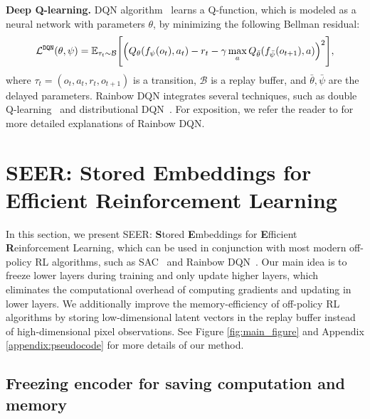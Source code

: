 \documentclass{article}
\begin{document}
{\bf Deep Q-learning.} DQN algorithm~\citep{mnih2015human} learns a Q-function, which is modeled as a neural network with parameters $\theta$,
by minimizing the following Bellman residual:
\begin{align*}
  \mathcal{L}^{\tt DQN} (\theta, \psi) = \mathbb{E}_{\tau_t \sim \mathcal{B}} \Bigg[\Big(Q_\theta(f_\psi(o_t),a_t) - r_t 
  - \gamma \max_a Q_{\bar \theta} (f_{\bar \psi}(o_{t+1}),a) \Big)^2\Bigg], \label{eq:dqn}
\end{align*}
where $\tau_t = (o_t,a_t,r_t,o_{t+1})$ is a transition,
$\mathcal{B}$ is a replay buffer, 
and $\bar \theta, \bar \psi$ are the delayed parameters.
Rainbow DQN integrates several techniques,
such as double Q-learning~\citep{van2016deep} and distributional DQN~\citep{bellemare2017distributional}.
For exposition, we refer the reader to \citet{hessel2018rainbow} for more detailed explanations of Rainbow DQN.

\section{SEER: Stored Embeddings for Efficient Reinforcement Learning}

In this section, we present SEER: {\bf S}tored {\bf E}mbeddings for {\bf E}fficient {\bf R}einforcement Learning, which can be used in conjunction with most modern off-policy RL algorithms, such as SAC~\citep{haarnoja2018soft} and Rainbow DQN~\citep{hessel2018rainbow}.
Our main idea is to freeze lower layers during training and only update higher layers, which eliminates the computational overhead of computing gradients and updating in lower layers.
We additionally improve the memory-efficiency of off-policy RL algorithms by storing low-dimensional latent vectors in the replay buffer instead of high-dimensional pixel observations. See Figure \ref{fig:main_figure} and 
Appendix \ref{appendix:pseudocode} for more details of our method.

\subsection{Freezing encoder for saving computation and memory} \label{sec:freezing_encoder}
\end{document}
